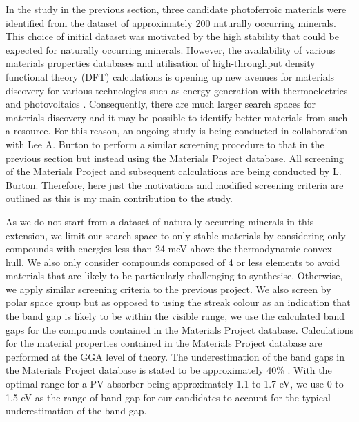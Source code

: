 \documentclass[11pt, twoside]{report}
\begin{document}

In the study in the previous section, three candidate photoferroic materials were identified from the dataset of approximately 200 naturally occurring minerals. This choice of initial dataset was motivated by the high stability that could be expected for naturally occurring minerals. However, the availability of various materials properties databases \cite{materials_project, aflowlib, NREL_data, TE_database, cmr, NOMAD} and utilisation of high-throughput density functional theory (DFT) calculations \cite{MP_highthroughput, HT_therm_cond, HT_properties} is opening up new avenues for materials discovery for various technologies \cite{roadmap} such as energy-generation with thermoelectrics \cite{thermoelectrics_rev, HT_thermoelectrics_1, HT_thermoelectrics_2} and photovoltaics \cite{SLME_screening, HT_PV, perovskite_screening_1, perovskite_screening_2, OPV_screening}.
Consequently, there are much larger search spaces for materials discovery and it may be possible to identify better materials from such a resource. 
For this reason, an ongoing study is being conducted in collaboration with Lee A. Burton to perform a similar screening procedure to that in the previous section but instead using the Materials Project \cite{materials_project} database. All screening of the Materials Project and subsequent calculations are being conducted by L. Burton. Therefore, here just the motivations and modified screening criteria are outlined as this is my main contribution to the study.

As we do not start from a dataset of naturally occurring minerals in this extension, we limit our search space to only stable materials by considering only compounds with energies less than 24 meV above the thermodynamic convex hull. We also only consider compounds composed of 4 or less elements to avoid materials that are likely to be particularly challenging to synthesise. 
Otherwise, we apply similar screening criteria to the previous project. We also screen by polar space group but as opposed to using the streak colour as an indication that the band gap is likely to be within the visible range, we use the calculated band gaps for the compounds contained in the Materials Project database. Calculations for the material properties contained in the Materials Project database are performed at the GGA level of theory.
The underestimation of the band gaps in the Materials Project database is stated to be approximately 40\% \cite{MP_bandgaps, MP_highthroughput}. With the optimal range for a PV absorber being approximately 1.1 to 1.7 eV, we use 0 to 1.5 eV as the range of band gap for our candidates to account for the typical underestimation of the band gap. 
\end{document}
